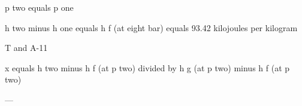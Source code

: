 p two equals p one  

h two minus h one equals h f (at eight bar) equals 93.42 kilojoules per kilogram  

T and A-11  

x equals h two minus h f (at p two) divided by h g (at p two) minus h f (at p two)  

---